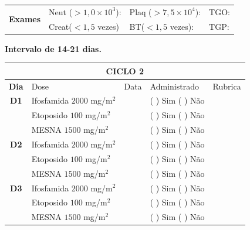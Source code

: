 \documentclass[11pt,a4paper,oldfontcommands]{memoir}
\begin{document}
\begin{center}
\begin{table}[H]
\begin{tabular}{p{1cm}p{5cm}|p{1.4cm}|p{3cm}|p{3cm}}
    \hline
    \multicolumn{1}{c|}{\multirow{2}{*}{\textbf{Exames}}}&\multicolumn{2}{l|}{Neut (\(>1,0\times10^3\)):}&{Plaq (\(>7,5\times10^4\)):}&{TGO:}\\
    \cline{2-5}
    \multicolumn{1}{c|}{\multirow{2}{*}{{}}}&\multicolumn{2}{l|}{Creat(\(<1,5\) vezes)}&{BT(\(<1,5\) vezes):}&{TGP:}
    \\
    \hline
\end{tabular}
\end{table}
\textbf{Intervalo de 14-21 dias.}
\begin{table}[H]
\begin{tabular}{p{1cm}p{5cm}|p{1.4cm}|p{3cm}|p{3cm}}
	\hline
	\multicolumn{5}{c}{\textbf{CICLO 2}}\\
\hline
    \multicolumn{1}{c|}{\multirow{1}{*}{\textbf{Dia}}}&{Dose}&{Data}&{Administrado}&{Rubrica} \\
    \hline
    \multicolumn{1}{c|}{\multirow{1}{*}{\textbf{D1}}}&{Ifosfamida \(2000\) mg/m\(^2\)}&&{(  ) Sim (  ) Não}&\\
    \multicolumn{1}{c|}{\multirow{1}{*}{\textbf{}}}&{Etoposido \(100\) mg/m\(^2\)}&&{(  ) Sim (  ) Não}&\\
    \multicolumn{1}{c|}{\multirow{1}{*}{\textbf{}}}&{MESNA \(1500\) mg/m\(^2\)}&&{(  ) Sim (  ) Não}&\\
    \multicolumn{1}{c|}{\multirow{1}{*}{\textbf{D2}}}&{Ifosfamida \(2000\) mg/m\(^2\)}&&{(  ) Sim (  ) Não}&\\
    \multicolumn{1}{c|}{\multirow{1}{*}{\textbf{}}}&{Etoposido \(100\) mg/m\(^2\)}&&{(  ) Sim (  ) Não}&\\
    \multicolumn{1}{c|}{\multirow{1}{*}{\textbf{}}}&{MESNA \(1500\) mg/m\(^2\)}&&{(  ) Sim (  ) Não}&\\
    \multicolumn{1}{c|}{\multirow{1}{*}{\textbf{D3}}}&{Ifosfamida \(2000\) mg/m\(^2\)}&&{(  ) Sim (  ) Não}&\\
    \multicolumn{1}{c|}{\multirow{1}{*}{\textbf{}}}&{Etoposido \(100\) mg/m\(^2\)}&&{(  ) Sim (  ) Não}&\\
    \multicolumn{1}{c|}{\multirow{1}{*}{\textbf{}}}&{MESNA \(1500\) mg/m\(^2\)}&&{(  ) Sim (  ) Não}&\\


\end{tabular}
\end{table}
\end{center}
\end{document}
